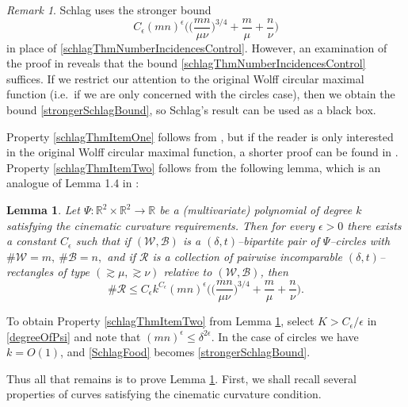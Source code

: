 \documentclass[reqno]{amsart}
\newtheorem{lem}[thm]{Lemma}
\theoremstyle{definition}
\theoremstyle{remark}
\newtheorem{rem}[thm]{Remark}
\theoremstyle{remark}
\newcommand{\RR}{\mathbb{R}}
\newcommand{\dt}{(\delta,t)}
\newcommand{\WB}{(\mathcal W,\mathcal B)}
\begin{document}
\begin{rem}
Schlag uses the stronger bound
\begin{equation}\label{strongerSchlagBound}
C_\epsilon(mn)^{\epsilon}\Big(\Big(\frac{mn}{\mu\nu}\Big)^{3/4}+\frac{m}{\mu}+\frac{n}{\nu}\Big)
\end{equation}
in place of \eqref{schlagThmNumberIncidencesControl}. However, an examination of the proof in \cite{Schlag} reveals that the bound \eqref{schlagThmNumberIncidencesControl} suffices. If we restrict our attention to the original Wolff circular maximal function (i.e.~if we are only concerned with the circles case), then we obtain the bound \eqref{strongerSchlagBound}, so Schlag's result can be used as a black box.
\end{rem}
%
%
Property \ref{schlagThmItemOne} follows from \cite[Lemma 3.1(i)]{Wolff3}, but if the reader is only interested in the original Wolff circular maximal function, a shorter proof can be found in \cite[\S 3]{Wolff2}. Property \ref{schlagThmItemTwo} follows from the following lemma, which is an analogue of Lemma 1.4 in \cite{Wolff4}:
\begin{lem}\label{thinkOfNameForLem1}
 Let $\Psi\colon \RR^2\times\RR^2\to \RR$ be a (multivariate) polynomial of degree $k$ satisfying the cinematic curvature requirements. Then for every $\epsilon>0$ there exists a constant $C_\epsilon$ such that if $\WB$ is a $\dt$--bipartite pair of $\Psi$--circles with $\#\mathcal W = m,\ \#\mathcal B = n,$ and if $\mathcal R$ is a collection of pairwise incomparable $\dt$--rectangles of type $(\gtrsim\mu,\gtrsim\nu)$ relative to $\WB$, then
\begin{equation}\label{SchlagFood}
\#\mathcal R \leq C_\epsilon k^{C_\epsilon} (mn)^{\epsilon}\Big(\Big(\frac{mn}{\mu\nu}\Big)^{3/4}+\frac{m}{\mu}+\frac{n}{\nu}\Big).
\end{equation}
\end{lem}

To obtain Property \ref{schlagThmItemTwo} from Lemma \ref{thinkOfNameForLem1}, select $K>C_\epsilon/\epsilon$ in \eqref{degreeOfPsi} and note that $(mn)^\epsilon\leq\delta^{2\epsilon}$. In the case of circles we have $k=O(1)$, and \eqref{SchlagFood} becomes \eqref{strongerSchlagBound}.

Thus all that remains is to prove Lemma \ref{thinkOfNameForLem1}. First, we shall recall several properties of curves satisfying the cinematic curvature condition.
%
%
\end{document}
